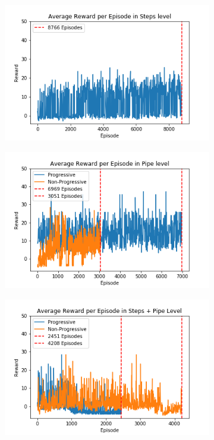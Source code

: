 \documentclass[notitlepage,a4paper,11pt]{article}
\begin{document}
\begin{figure}[t]
     \centering
     \begin{subfigure}[t]{0.32\textwidth}
         \centering
         \includegraphics[width=\textwidth]{figs/fun_results_1.png}
         \caption{}
         \label{fig:fun_results_1}
     \end{subfigure}
     \hfill
     \begin{subfigure}[t]{0.32\textwidth}
         \centering
         \includegraphics[width=\textwidth]{figs/fun_results_2.png}
         \caption{}
         \label{fig:fun_results_2}
     \end{subfigure}
     \hfill
     \begin{subfigure}[t]{0.32\textwidth}
         \centering
         \includegraphics[width=\textwidth]{figs/fun_results_3.png}

\end{subfigure}
\end{figure}
\end{document}
